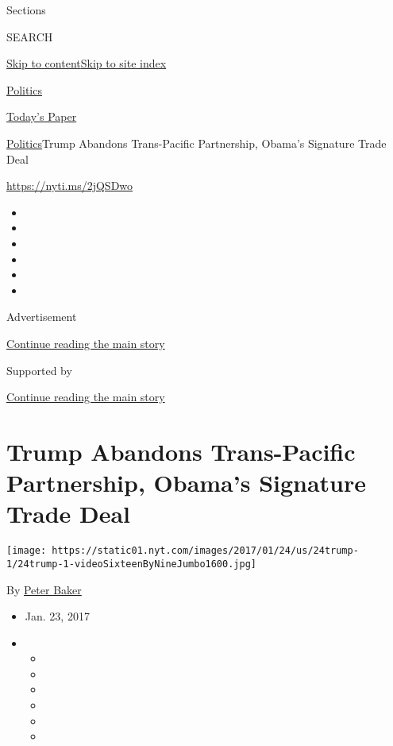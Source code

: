 Sections

SEARCH

\protect\hyperlink{site-content}{Skip to
content}\protect\hyperlink{site-index}{Skip to site index}

\href{https://www.nytimes.com/section/politics}{Politics}

\href{https://myaccount.nytimes.com/auth/login?response_type=cookie\&client_id=vi}{}

\href{https://www.nytimes.com/section/todayspaper}{Today's Paper}

\href{/section/politics}{Politics}\textbar{}Trump Abandons Trans-Pacific
Partnership, Obama's Signature Trade Deal

\url{https://nyti.ms/2jQSDwo}

\begin{itemize}
\item
\item
\item
\item
\item
\item
\end{itemize}

Advertisement

\protect\hyperlink{after-top}{Continue reading the main story}

Supported by

\protect\hyperlink{after-sponsor}{Continue reading the main story}

\hypertarget{trump-abandons-trans-pacific-partnership-obamas-signature-trade-deal}{%
\section{Trump Abandons Trans-Pacific Partnership, Obama's Signature
Trade
Deal}\label{trump-abandons-trans-pacific-partnership-obamas-signature-trade-deal}}

\texttt{[image: https://static01.nyt.com/images/2017/01/24/us/24trump-1/24trump-1-videoSixteenByNineJumbo1600.jpg]}

By \href{http://www.nytimes.com/by/peter-baker}{Peter Baker}

\begin{itemize}
\item
  Jan. 23, 2017
\item
  \begin{itemize}
  \item
  \item
  \item
  \item
  \item
  \item
  \end{itemize}
\end{itemize}

